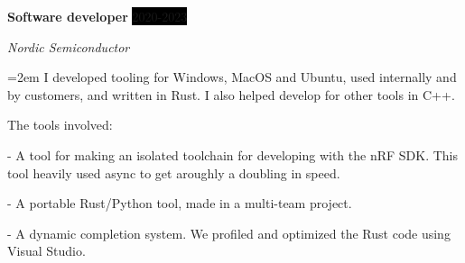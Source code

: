 \documentclass[paper=a4,fontsize=11pt,norsk]{scrartcl} %
\newcommand{\EducationEntry}[4]{
		\noindent \textbf{#1} \hfill      %
		\colorbox{Black}{%
			\parbox{6em}{%
			\hfill\color{White}#2}} \par  %
		\noindent \textit{#3} \par        %
		\noindent\hangindent=2em\hangafter=0 \small #4 %
		\normalsize \par}
\newcommand{\WorkEntry}[4]{				  %
		\noindent \textbf{#1} \hfill      %
		\colorbox{Black}{\color{White}#2} \par  %
		\noindent \textit{#3} \par              %
		\noindent\hangindent=2em\hangafter=0 \small #4 %
		\normalsize \par}
\begin{document}







\WorkEntry{Software developer}{2020-2023}{Nordic Semiconductor}
{I developed tooling for Windows, MacOS and Ubuntu, used internally and by customers, and written in Rust. I also helped develop for other tools in C++.

The tools involved: 
\par


-  A tool for making an isolated toolchain for developing with the nRF SDK. This tool heavily used async to get aroughly a doubling in speed. 
\par 



- A portable Rust/Python tool, made in a multi-team project. 
\par



- A dynamic completion system. We profiled and optimized the Rust code using Visual Studio. 
}
\end{document}
